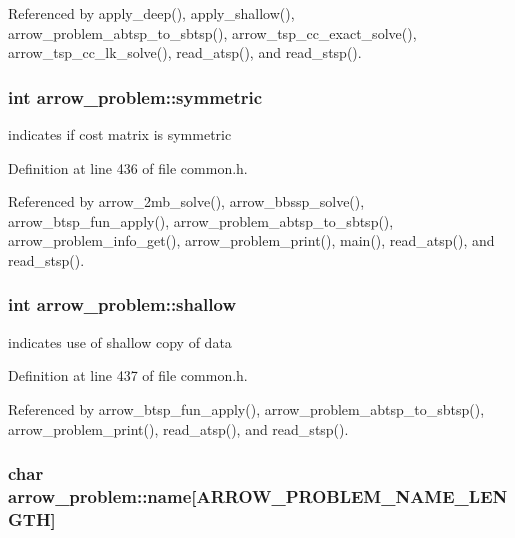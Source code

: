 Referenced by apply\_\-deep(), apply\_\-shallow(), arrow\_\-problem\_\-abtsp\_\-to\_\-sbtsp(), arrow\_\-tsp\_\-cc\_\-exact\_\-solve(), arrow\_\-tsp\_\-cc\_\-lk\_\-solve(), read\_\-atsp(), and read\_\-stsp().\hypertarget{structarrow__problem_168ab92e9d7a873740a2550f4d3510d9}{
\subsubsection{\setlength{\rightskip}{0pt plus 5cm}int {\bf arrow\_\-problem::symmetric}}}
\label{structarrow__problem_168ab92e9d7a873740a2550f4d3510d9}


indicates if cost matrix is symmetric 

Definition at line 436 of file common.h.

Referenced by arrow\_\-2mb\_\-solve(), arrow\_\-bbssp\_\-solve(), arrow\_\-btsp\_\-fun\_\-apply(), arrow\_\-problem\_\-abtsp\_\-to\_\-sbtsp(), arrow\_\-problem\_\-info\_\-get(), arrow\_\-problem\_\-print(), main(), read\_\-atsp(), and read\_\-stsp().\hypertarget{structarrow__problem_8c3f4f7794c1430440658d69151b296d}{
\subsubsection{\setlength{\rightskip}{0pt plus 5cm}int {\bf arrow\_\-problem::shallow}}}
\label{structarrow__problem_8c3f4f7794c1430440658d69151b296d}


indicates use of shallow copy of data 

Definition at line 437 of file common.h.

Referenced by arrow\_\-btsp\_\-fun\_\-apply(), arrow\_\-problem\_\-abtsp\_\-to\_\-sbtsp(), arrow\_\-problem\_\-print(), read\_\-atsp(), and read\_\-stsp().\hypertarget{structarrow__problem_8b7fec7ddd0462d3d841b87e287cff9f}{
\subsubsection{\setlength{\rightskip}{0pt plus 5cm}char {\bf arrow\_\-problem::name}\mbox{[}ARROW\_\-PROBLEM\_\-NAME\_\-LENGTH\mbox{]}}}
\label{structarrow__problem_8b7fec7ddd0462d3d841b87e287cff9f}


